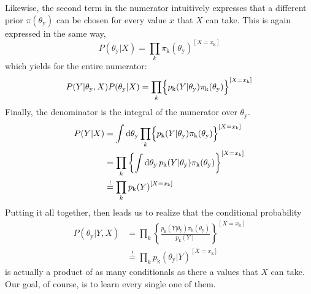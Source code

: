 \documentclass[]{report}
\begin{document}
Likewise, the second term in the numerator intuitively expresses that a different prior $\pi( \theta_\mathrm{y} ) $ can be chosen for every value $x$ that $X$ can take. This is again expressed in the same way,
\begin{equation} \label{eq:2param_prior_Y}
P( \theta_\mathrm{y} | X ) 
=
\prod_{k}
	{
		\pi_\mathrm{k}( \theta_\mathrm{y} )
	}
	^
	{
		[ X = x_\mathrm{k} ]
	}
\end{equation}
which yields for the entire numerator:
\begin{equation}
P( Y | \theta_\mathrm{y}, X )
P( \theta_\mathrm{y} | X ) 
=
\prod_{k}
	\Bigl\{
		p_\mathrm{k}( Y | \theta_\mathrm{y} )
		\pi_\mathrm{k}( \theta_\mathrm{y} )
	\Bigr\}
	^
	{
		[ X = x_\mathrm{k} ]
	}
\end{equation}
Finally, the denominator is the integral of the numerator over $\theta_\mathrm{y}$.
\begin{align}
P(Y|X)
&=
\int \mathrm{d}\theta_\mathrm{y}
	\prod_{k}
		\Bigl\{
			p_\mathrm{k}( Y | \theta_\mathrm{y} )
			\pi_\mathrm{k}( \theta_\mathrm{y} )
		\Bigr\}
		^
		{
			[ X = x_\mathrm{k} ]
		}
\nonumber \\ 
&=
\prod_{k}
	\left\{
		\int \mathrm{d}\theta_\mathrm{y} \,
			p_\mathrm{k}( Y | \theta_\mathrm{y} )
			\pi_\mathrm{k}( \theta_\mathrm{y} )
	\right\}
	^
	{
		[ X = x_\mathrm{k} ]
	}
\\
&\stackrel{!}{=}
\prod_{k}
	{
		p_\mathrm{k}( Y )
	}
	^
	{
		[ X = x_\mathrm{k} ]
	}
\nonumber
\end{align}
Putting it all together, then leads us to realize that the conditional probability
\begin{align}
P( \theta_\mathrm{y} |Y, X ) 
&=
\prod_{k}
	\left\{
		\frac
			{
				p_\mathrm{k}( Y | \theta_\mathrm{y} )
				\pi_\mathrm{k}( \theta_\mathrm{y} )
			}
			{
				p_\mathrm{k}( Y )
			}
	\right\}
	^
	{
		[ X = x_\mathrm{k} ]
	}
\nonumber \\
&\stackrel{!}{=}
\prod_{k}
	{
		p_\mathrm{k}( \theta_\mathrm{y} | Y )
	}
	^
	{
		[ X = x_\mathrm{k} ]
	}
\end{align}
is actually a product of as many conditionals as there a values that $X$ can take. Our goal, of course, is to learn every single one of them.
\end{document}
